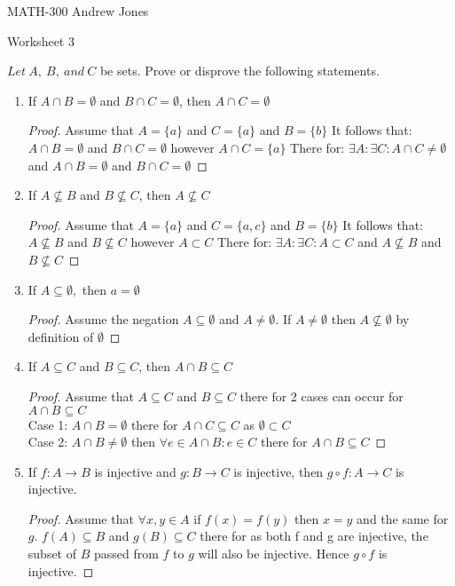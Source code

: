 \documentclass{article}
\begin{document}
  MATH-300 \hfill Andrew Jones
  \begin{center}
  {\huge Worksheet 3}
  \end{center}
  $Let\ A,\ B,\ and\ C$ be sets. Prove or disprove the following statements. \\
  \begin{enumerate}
  \item If $A\cap B = \emptyset$ and $B\cap C = \emptyset$, then $A\cap C = \emptyset$
    \begin{proof}
      Assume that $A = \{a\}$ and $C = \{a\}$ and $B = \{b\}$ 
      It follows that: $A\cap B = \emptyset$ and $B\cap C = \emptyset$ however $A\cap C = \{a\}$
      There for: $\exists A: \exists C: A\cap C \neq \emptyset$ and $A\cap B = \emptyset$ and $B\cap C = \emptyset$  
    \end{proof}
  \item If $A\not\subseteq B$ and $B\not\subseteq C$, then $A\not\subseteq C$ 
    \begin{proof}
      Assume that $A = \{a\}$ and $C = \{a, c\}$ and $B = \{b\}$ 
      It follows that: $A\not\subseteq B$ and $B\not\subseteq C$ however $A\subset C$
      There for: $\exists A: \exists C: A\subset C$ and $A\not\subseteq B$ and $B\not\subseteq C$  
    \end{proof}
  \item If $A\subseteq \emptyset,$ then $a= \emptyset$ 
    \begin{proof}
      Assume the negation $A\subseteq \emptyset$ and $A \neq \emptyset$.
      If $A \neq \emptyset$ then $A\not\subseteq \emptyset$ by definition of $\emptyset$ 
    \end{proof}
  \item If $A\subseteq C$ and $B\subseteq C$, then $A\cap B\subseteq C$
    \begin{proof}
     Assume that $A\subseteq C$ and $B\subseteq C$ there for 2 cases can occur for $A\cap B\subseteq C$ \\
     Case 1: $A\cap B = \emptyset$ there for $A\cap C\subseteq C$ as $\emptyset \subset C$ \\
     Case 2: $A\cap B \neq \emptyset$ then $\forall e\in A\cap B: e\in C$ there for $A\cap B \subseteq C$
    \end{proof}
  \item If $f : A\to B$ is injective and $g : B\to C$ is injective, then $g \circ f : A\to C$ is injective. 
    \begin{proof}
      Assume that $\forall x,y\in A$ if $f(x) = f(y)$ then $x = y$ and the same for $g$. $f(A) \subseteq B$ and $g(B) \subseteq C$ there for as both f and g are injective, the subset of $B$ passed from $f$ to $g$ will also be injective. Hence $g \circ f$ is injective.

\end{proof}
\end{enumerate}
\end{document}
